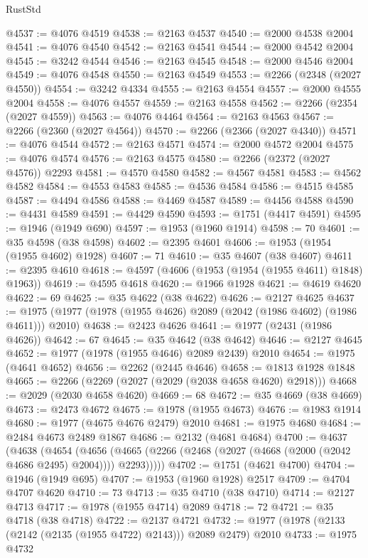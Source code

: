 \begin{lexlean}{RustStd}
\begin{coremodule}
@4537 := @4076 @4519
@4538 := @2163 @4537
@4540 := @2000 @4538 @2004
@4541 := @4076 @4540
@4542 := @2163 @4541
@4544 := @2000 @4542 @2004
@4545 := @3242 @4544
@4546 := @2163 @4545
@4548 := @2000 @4546 @2004
@4549 := @4076 @4548
@4550 := @2163 @4549
@4553 := @2266 (@2348 (@2027 @4550))
@4554 := @3242 @4334
@4555 := @2163 @4554
@4557 := @2000 @4555 @2004
@4558 := @4076 @4557
@4559 := @2163 @4558
@4562 := @2266 (@2354 (@2027 @4559))
@4563 := @4076 @4464
@4564 := @2163 @4563
@4567 := @2266 (@2360 (@2027 @4564))
@4570 := @2266 (@2366 (@2027 @4340))
@4571 := @4076 @4544
@4572 := @2163 @4571
@4574 := @2000 @4572 @2004
@4575 := @4076 @4574
@4576 := @2163 @4575
@4580 := @2266 (@2372 (@2027 @4576)) @2293
@4581 := @4570 @4580
@4582 := @4567 @4581
@4583 := @4562 @4582
@4584 := @4553 @4583
@4585 := @4536 @4584
@4586 := @4515 @4585
@4587 := @4494 @4586
@4588 := @4469 @4587
@4589 := @4456 @4588
@4590 := @4431 @4589
@4591 := @4429 @4590
@4593 := @1751 (@4417 @4591)
@4595 := @1946 (@1949 @690)
@4597 := @1953 (@1960 @1914)
@4598 := 70
@4601 := @35 @4598 (@38 @4598)
@4602 := @2395 @4601
@4606 := @1953 (@1954 (@1955 @4602) @1928)
@4607 := 71
@4610 := @35 @4607 (@38 @4607)
@4611 := @2395 @4610
@4618 := @4597 (@4606 (@1953 (@1954 (@1955 @4611) @1848) @1963))
@4619 := @4595 @4618
@4620 := @1966 @1928
@4621 := @4619 @4620
@4622 := 69
@4625 := @35 @4622 (@38 @4622)
@4626 := @2127 @4625
@4637 := @1975 (@1977 (@1978 (@1955 @4626) @2089 (@2042 (@1986 @4602) (@1986 @4611))) @2010)
@4638 := @2423 @4626
@4641 := @1977 (@2431 (@1986 @4626))
@4642 := 67
@4645 := @35 @4642 (@38 @4642)
@4646 := @2127 @4645
@4652 := @1977 (@1978 (@1955 @4646) @2089 @2439) @2010
@4654 := @1975 (@4641 @4652)
@4656 := @2262 (@2445 @4646)
@4658 := @1813 @1928 @1848
@4665 := @2266 (@2269 (@2027 (@2029 (@2038 @4658 @4620) @2918)))
@4668 := @2029 (@2030 @4658 @4620)
@4669 := 68
@4672 := @35 @4669 (@38 @4669)
@4673 := @2473 @4672
@4675 := @1978 (@1955 @4673)
@4676 := @1983 @1914
@4680 := @1977 (@4675 @4676 @2479) @2010
@4681 := @1975 @4680
@4684 := @2484 @4673 @2489 @1867
@4686 := @2132 (@4681 @4684)
@4700 := @4637
    (@4638
      (@4654
        (@4656 (@4665 (@2266 (@2468 (@2027 (@4668 (@2000 (@2042 @4686 @2495) @2004)))) @2293)))))
@4702 := @1751 (@4621 @4700)
@4704 := @1946 (@1949 @695)
@4707 := @1953 (@1960 @1928) @2517
@4709 := @4704 @4707 @4620
@4710 := 73
@4713 := @35 @4710 (@38 @4710)
@4714 := @2127 @4713
@4717 := @1978 (@1955 @4714) @2089
@4718 := 72
@4721 := @35 @4718 (@38 @4718)
@4722 := @2137 @4721
@4732 := @1977 (@1978 (@2133 (@2142 (@2135 (@1955 @4722) @2143))) @2089 @2479) @2010
@4733 := @1975 @4732

\end{coremodule}
\end{lexlean}
